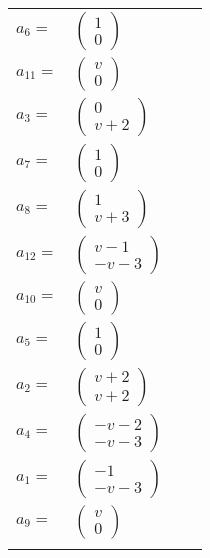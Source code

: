 \documentclass[1p]{elsarticle_modified}
\theoremstyle{definition}
\begin{document}
\begin{tabular}{m{7pt} m{180pt} m{7pt} m{180pt} }
\flushright $a_{6}=$&$\begin{pmatrix}1\\0\end{pmatrix}$ \\
\flushright $a_{11}=$&$\begin{pmatrix}v\\0\end{pmatrix}$ \\
\flushright $a_{3}=$&$\begin{pmatrix}0\\v+2\end{pmatrix}$ \\
\flushright $a_{7}=$&$\begin{pmatrix}1\\0\end{pmatrix}$ \\
\flushright $a_{8}=$&$\begin{pmatrix}1\\v+3\end{pmatrix}$ \\
\flushright $a_{12}=$&$\begin{pmatrix}v-1\\- v-3\end{pmatrix}$ \\
\flushright $a_{10}=$&$\begin{pmatrix}v\\0\end{pmatrix}$ \\
\flushright $a_{5}=$&$\begin{pmatrix}1\\0\end{pmatrix}$ \\
\flushright $a_{2}=$&$\begin{pmatrix}v+2\\v+2\end{pmatrix}$ \\
\flushright $a_{4}=$&$\begin{pmatrix}- v-2\\- v-3\end{pmatrix}$ \\
\flushright $a_{1}=$&$\begin{pmatrix}-1\\- v-3\end{pmatrix}$ \\
\flushright $a_{9}=$&$\begin{pmatrix}v\\0\end{pmatrix}$\\&\end{tabular}
\end{document}
